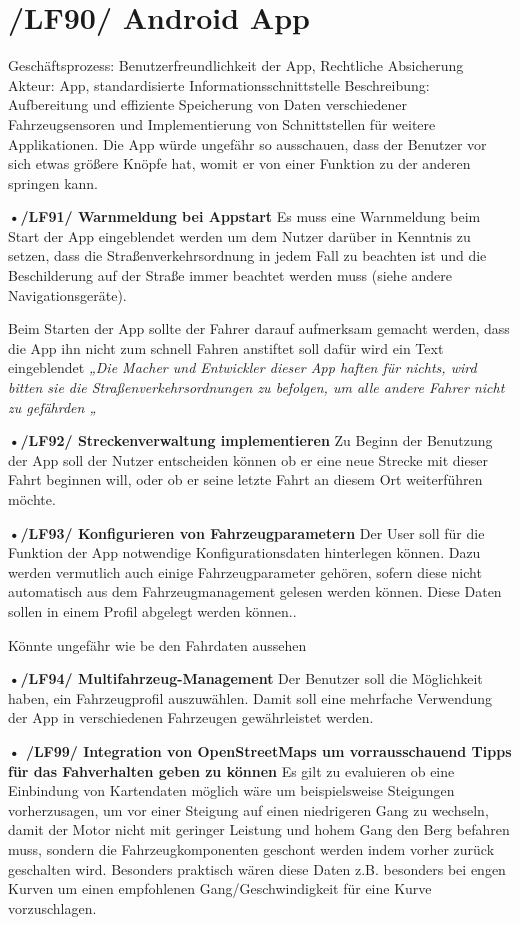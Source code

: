 \section{/LF90/ Android App}
Geschäftsprozess:	Benutzerfreundlichkeit der App, Rechtliche Absicherung
Akteur:			App, standardisierte Informationsschnittstelle
Beschreibung:	Aufbereitung und effiziente Speicherung von Daten verschiedener Fahrzeugsensoren und Implementierung von Schnittstellen für weitere Applikationen. 
Die App würde ungefähr so ausschauen, dass der Benutzer vor sich etwas größere Knöpfe hat,                                        
womit er von einer Funktion zu der anderen springen kann.

\textbf{•/LF91/ Warnmeldung bei Appstart}
Es muss eine Warnmeldung beim Start der App eingeblendet werden um dem Nutzer darüber in Kenntnis zu setzen, dass die Straßenverkehrsordnung in jedem Fall zu beachten ist und die Beschilderung auf der Straße immer beachtet werden muss (siehe andere Navigationsgeräte).

Beim Starten der App sollte der Fahrer darauf aufmerksam gemacht werden, dass die App ihn nicht zum schnell Fahren anstiftet soll dafür wird ein Text eingeblendet
\emph{„Die Macher und Entwickler dieser App haften für nichts, wird bitten sie die Straßenverkehrsordnungen zu befolgen, um alle andere Fahrer nicht zu gefährden „}

\textbf{•/LF92/ Streckenverwaltung implementieren}
Zu Beginn der Benutzung der App soll der Nutzer entscheiden können ob er eine neue Strecke mit dieser Fahrt beginnen will, oder ob er seine letzte Fahrt an diesem Ort weiterführen möchte.

\textbf{•/LF93/ Konfigurieren von Fahrzeugparametern}
Der User soll für die Funktion der App notwendige Konfigurationsdaten hinterlegen können. Dazu werden vermutlich auch einige Fahrzeugparameter gehören, sofern diese nicht automatisch aus dem Fahrzeugmanagement gelesen werden können. Diese Daten sollen in einem Profil abgelegt werden können..

Könnte ungefähr wie be den Fahrdaten aussehen 

\textbf{•/LF94/ Multifahrzeug-Management}
Der Benutzer soll die Möglichkeit haben, ein Fahrzeugprofil auszuwählen. Damit soll eine mehrfache Verwendung der App in verschiedenen Fahrzeugen gewährleistet werden.

\textbf{• /LF99/ Integration von OpenStreetMaps um vorrausschauend Tipps für das Fahverhalten geben zu können}
Es gilt zu evaluieren ob eine Einbindung von Kartendaten möglich wäre um beispielsweise Steigungen vorherzusagen, um vor einer Steigung auf einen niedrigeren Gang zu wechseln, damit der Motor nicht mit geringer Leistung und hohem Gang den Berg befahren muss, sondern die Fahrzeugkomponenten geschont werden indem vorher zurück geschalten wird. Besonders praktisch wären diese Daten z.B. besonders bei engen Kurven um einen empfohlenen Gang/Geschwindigkeit für eine Kurve vorzuschlagen.
